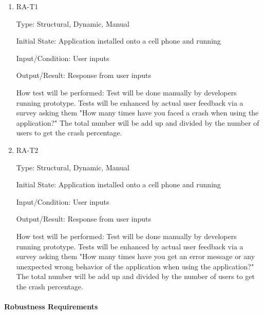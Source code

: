 \documentclass[12pt, titlepage]{article}
\begin{document}
\begin{enumerate}

\item{RA-T1\\}

Type: Structural, Dynamic, Manual
					
Initial State: Application installed onto a cell phone and running
					
Input/Condition: User inputs
					
Output/Result: Response from user inputs
					
How test will be performed: Test will be done manually by developers running prototype. Tests will be enhanced by actual user feedback via a survey asking them "How many times have you faced a crash when using the application?" The total number will be add up and divided by the number of users to get the crash percentage.
					
\item{RA-T2\\}

Type: Structural, Dynamic, Manual
					
Initial State: Application installed onto a cell phone and running
					
Input/Condition: User inputs
					
Output/Result: Response from user inputs
					
How test will be performed: Test will be done manually by developers running prototype. Tests will be enhanced by actual user feedback via a survey asking them "How many times have you get an error message or any unexpected wrong behavior of the application when using the application?" The total number will be add up and divided by the number of users to get the crash percentage.

\end{enumerate}

\paragraph{Robustness Requirements}
\end{document}
